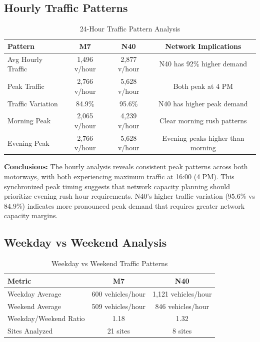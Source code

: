 \documentclass[MScCS]{uccthesis}
\begin{document}
\subsection{Hourly Traffic Patterns}

\begin{table}[h]
\centering
\caption{24-Hour Traffic Pattern Analysis}
\label{tab:hourly_patterns}
\begin{tabular}{|l|c|c|c|}
\hline
\textbf{Pattern} & \textbf{M7} & \textbf{N40} & \textbf{Network Implications} \\
\hline
Avg Hourly Traffic & 1,496 v/hour & 2,877 v/hour & N40 has 92\% higher demand \\
\hline
Peak Traffic & 2,766 v/hour  & 5,628 v/hour  & Both peak at 4 PM \\
\hline
Traffic Variation & 84.9\% & 95.6\% & N40 has higher peak demand \\
\hline
Morning Peak & 2,065 v/hour  & 4,239 v/hour  & Clear morning rush patterns \\
\hline
Evening Peak & 2,766 v/hour  & 5,628 v/hour  & Evening peaks higher than morning \\
\hline
\end{tabular}
\end{table}

\textbf{Conclusions:} The hourly analysis reveals consistent peak patterns across both motorways, with both experiencing maximum traffic at 16:00 (4 PM). This synchronized peak timing suggests that network capacity planning should prioritize evening rush hour requirements. N40's higher traffic variation (95.6\% vs 84.9\%) indicates more pronounced peak demand that requires greater network capacity margins.

\subsection{Weekday vs Weekend Analysis}

\begin{table}[H]
\centering
\caption{Weekday vs Weekend Traffic Patterns}
\label{tab:weekday_weekend}
\begin{tabular}{|l|c|c|}
\hline
\textbf{Metric} & \textbf{M7} & \textbf{N40}  \\
\hline
Weekday Average & 600 vehicles/hour & 1,121 vehicles/hour\\
\hline
Weekend Average & 509 vehicles/hour & 846 vehicles/hour \\
\hline
Weekday/Weekend Ratio & 1.18 & 1.32  \\
\hline
Sites Analyzed & 21 sites & 8 sites  \\
\hline
\end{tabular}
\end{table}
\end{document}
